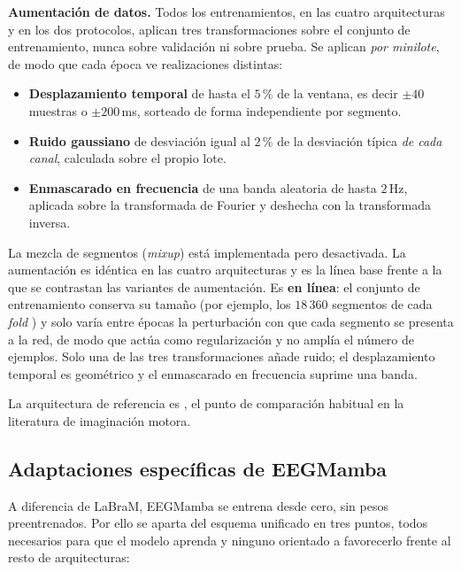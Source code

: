 \textbf{Aumentación de datos.} Todos los entrenamientos, en las cuatro arquitecturas y
en los dos protocolos, aplican tres transformaciones sobre el conjunto de entrenamiento,
nunca sobre validación ni sobre prueba. Se aplican \emph{por minilote}, de modo que cada
época ve realizaciones distintas:

\begin{itemize}
  \item \textbf{Desplazamiento temporal} de hasta el $5$\,\% de la ventana, es decir
  $\pm 40$ muestras o $\pm 200$\,ms, sorteado de forma independiente por segmento.
  \item \textbf{Ruido gaussiano} de desviación igual al $2$\,\% de la desviación típica
  \emph{de cada canal}, calculada sobre el propio lote.
  \item \textbf{Enmascarado en frecuencia} de una banda aleatoria de hasta $2$\,Hz,
  aplicada sobre la transformada de Fourier y deshecha con la transformada inversa.
\end{itemize}

La mezcla de segmentos (\textit{mixup}) está implementada pero desactivada. La
aumentación es idéntica en las cuatro arquitecturas y es la línea base frente a la que se
contrastan las variantes de aumentación. Es \textbf{en línea}: el conjunto de entrenamiento
conserva su tamaño (por ejemplo, los $18\,360$ segmentos de cada \textit{fold} \loso{}) y
solo varía entre épocas la perturbación con que cada segmento se presenta a la red, de modo
que actúa como regularización y no amplía el número de ejemplos. Solo una de las tres
transformaciones añade ruido; el desplazamiento temporal es geométrico y el enmascarado en
frecuencia suprime una banda.

La arquitectura de referencia es \eegnet{} \cite{lawhern2018}, el punto de comparación
habitual en la literatura de imaginación motora.

\subsection{Adaptaciones específicas de EEGMamba}
\label{sec:eegmamba-adapt}

A diferencia de LaBraM, EEGMamba se entrena desde cero, sin pesos preentrenados.
Por ello se aparta del esquema unificado en tres puntos, todos necesarios para que
el modelo aprenda y ninguno orientado a favorecerlo frente al resto de
arquitecturas:

